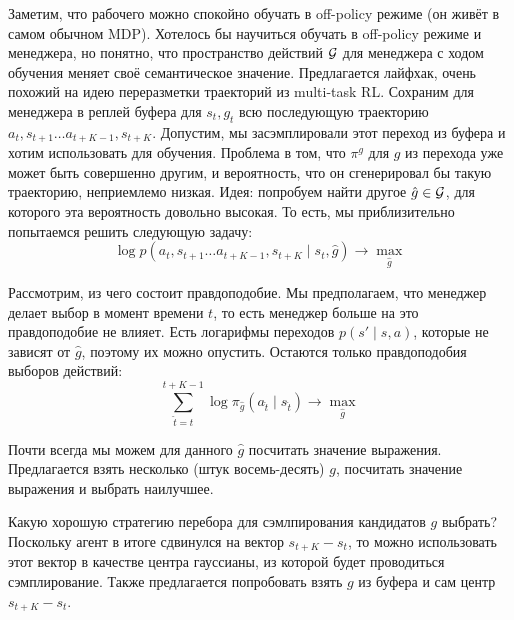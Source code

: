 Заметим, что рабочего можно спокойно обучать в off-policy режиме (он живёт в самом обычном MDP). Хотелось бы научиться обучать в off-policy режиме и менеджера, но понятно, что пространство действий $\mathcal{G}$ для менеджера с ходом обучения меняет своё семантическое значение. Предлагается лайфхак, очень похожий на идею переразметки траекторий из multi-task RL. Сохраним для менеджера в реплей буфера для $s_t, g_t$ всю последующую траекторию $a_t, s_{t+1} \dots a_{t + K - 1}, s_{t + K}$. Допустим, мы засэмплировали этот переход из буфера и хотим использовать для обучения. Проблема в том, что $\pi^g$ для $g$ из перехода уже может быть совершенно другим, и вероятность, что он сгенерировал бы такую траекторию, неприемлемо низкая. Идея: попробуем найти другое $\hat{g} \in \mathcal{G}$, для которого эта вероятность довольно высокая. То есть, мы приблизительно попытаемся решить следующую задачу:
$$\log p(a_t, s_{t+1} \dots a_{t + K - 1}, s_{t + K} \mid s_t, \hat{g}) \to \max_{\hat{g}}$$

Рассмотрим, из чего состоит правдоподобие. Мы предполагаем, что менеджер делает выбор в момент времени $t$, то есть менеджер больше на это правдоподобие не влияет. Есть логарифмы переходов $p(s' \mid s, a)$, которые не зависят от $\hat{g}$, поэтому их можно опустить. Остаются только правдоподобия выборов действий:
$$\sum_{\hat{t} = t}^{t + K - 1} \log \pi_{\hat{g}}(a_{\hat{t}} \mid s_{\hat{t}}) \to \max_{\hat{g}}$$

Почти всегда мы можем для данного $\hat{g}$ посчитать значение выражения. Предлагается взять несколько (штук восемь-десять) $g$, посчитать значение выражения и выбрать наилучшее. 

Какую хорошую стратегию перебора для сэмлпирования кандидатов $g$ выбрать? Поскольку агент в итоге сдвинулся на вектор $s_{t + K} - s_t$, то можно использовать этот вектор в качестве центра гауссианы, из которой будет проводиться сэмплирование. Также предлагается попробовать взять $g$ из буфера и сам центр $s_{t + K} - s_t$.
